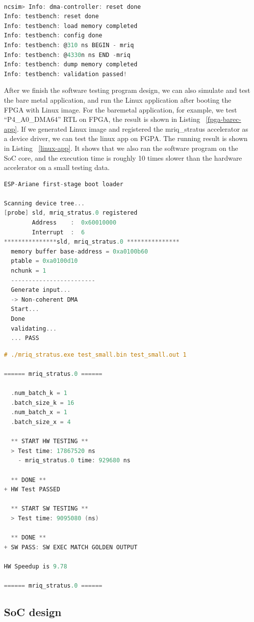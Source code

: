 \begin{lstlisting}[language=C, caption=RTL simulation of P4\_A1\_DMA64
  ,label={sim-rtl}]

ncsim> Info: dma-controller: reset done
Info: testbench: reset done
Info: testbench: load memory completed
Info: testbench: config done
Info: testbench: @310 ns BEGIN - mriq
Info: testbench: @4330n ns END -mriq
Info: testbench: dump memory completed
Info: testbench: validation passed!

\end{lstlisting}


After we finish the software testing program design, we can also simulate and
test the bare metal application, and run the Linux application after booting the
FPGA with Linux image. For the baremetal application, for example, we test
``P4\_A0\_DMA64'' RTL on FPGA, the result is shown in Listing ~\ref{fpga-barec-app}. If
we generated Linux image and registered the mriq\_stratus accelerator as a
device driver, we can test the linux app on FGPA. The running result is shown in
Listing ~\ref{linux-app}. It shows that we also ran the
software program on the SoC core, and the execution time is roughly 10 times
slower than the hardware accelerator on a small testing data.

\begin{lstlisting}[language=C, caption=Running baremetal app on FPGA, 
    label=fpga-barec-app]
ESP-Ariane first-stage boot loader

Scanning device tree...
[probe] sld, mriq_stratus.0 registered
        Address    :  0x60010000    
        Interrupt  :  6
***************sld, mriq_stratus.0 ***************
  memory buffer base-address = 0xa0100b60
  ptable = 0xa0100d10
  nchunk = 1
  ------------------------
  Generate input...
  -> Non-coherent DMA
  Start...
  Done
  validating...
  ... PASS
\end{lstlisting}


\begin{lstlisting}[language=C, caption=Running Linux app on FPGA, 
    label={linux-app}]
# ./mriq_stratus.exe test_small.bin test_small.out 1

====== mriq_stratus.0 ======

  .num_batch_k = 1
  .batch_size_k = 16
  .num_batch_x = 1
  .batch_size_x = 4
  
  ** START HW TESTING **
  > Test time: 17867520 ns
    - mriq_stratus.0 time: 929680 ns
    
  ** DONE **
+ HW Test PASSED

  ** START SW TESTING **
  > Test time: 9095080 (ns)
  
  ** DONE **
+ SW PASS: SW EXEC MATCH GOLDEN OUTPUT

HW Speedup is 9.78

====== mriq_stratus.0 ======
\end{lstlisting}


\subsection{SoC design}
